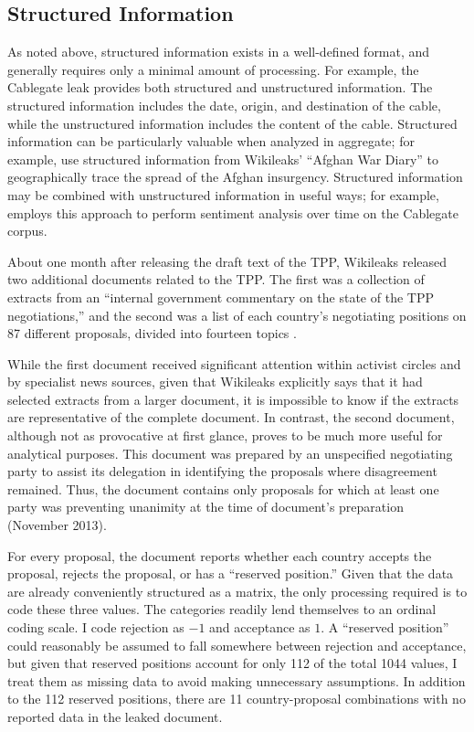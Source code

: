 \documentclass[12pt]{article}
\begin{document}
\subsection{Structured Information}

As noted above, structured information exists in a well-defined format, and generally requires only 
a minimal amount of processing. For example, the Cablegate leak provides both structured and 
unstructured information. The structured information includes 
the date, origin, and destination of the cable, while the unstructured information includes the content 
of the cable.
Structured information can be particularly valuable when analyzed 
in aggregate; for example, \citet{oloughlin2010peering} use structured information from Wikileaks' ``Afghan 
War Diary'' to geographically trace the spread of the Afghan insurgency. Structured information may be 
combined with unstructured information in useful ways; for example, \citet{paruchuri2012tracking} employs this 
approach to perform sentiment analysis over time on the Cablegate corpus.

About one month after releasing the draft text of the TPP, Wikileaks released two 
additional documents related to the TPP. The first was a collection of extracts from an ``internal 
government commentary on the state of the TPP negotiations,'' and the second was a list of each 
country's negotiating positions on 87 different 
proposals, divided into fourteen topics \citep{wikileaks2013second}.

While the first document received significant 
attention within activist circles and by specialist news sources, given that Wikileaks 
explicitly says that it had selected extracts from a larger document, it is impossible to know if the  
extracts are representative of the complete document. In contrast, the second document, although 
not as provocative at first glance, proves to be much more useful for 
analytical purposes. This document was prepared by an unspecified 
negotiating party to assist its delegation in identifying the proposals where disagreement remained. 
Thus, the document contains only proposals for which at least one party was preventing unanimity at 
the time of document's preparation (November 2013).

For every proposal, the document reports whether each country accepts the proposal, rejects the 
proposal, 
or has a ``reserved position.''	Given that the data are already conveniently structured as a matrix, 
the only processing required is to code these three values. The categories 
readily lend themselves to an ordinal coding scale. I code rejection as $-1$ and acceptance as 
$1$. A 
``reserved position'' could reasonably be assumed to fall somewhere between rejection and acceptance, 
but given that reserved positions account for only 112 of the total 1044 values, I treat them as 
missing data to avoid making unnecessary assumptions. In addition to the 112 reserved positions, 
there are 11 country-proposal combinations with no reported data in the leaked document.
\end{document}
